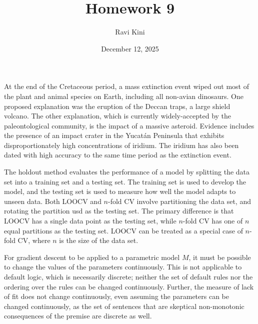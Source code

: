 \documentclass{article}
\title{Homework 9}
\author{Ravi Kini}
\date{December 12, 2025}
\begin{document}
\maketitle

\problem{}
At the end of the Cretaceous period, a mass extinction event wiped out most of the plant and animal species on Earth, including all non-avian dinosaurs. One proposed explanation was the eruption of the Deccan traps, a large shield volcano. The other explanation, which is currently widely-accepted by the paleontological community, is the impact of a massive asteroid. Evidence includes the presence of an impact crater in the Yucatán Peninsula that exhibits disproportionately high concentrations of iridium. The iridium has also been dated with high accuracy to the same time period as the extinction event.

\clearpage
\problem{}
The holdout method evaluates the performance of a model by splitting the data set into a training set and a testing set. The training set is used to develop the model, and the testing set is used to measure how well the model adapts to unseen data.
Both LOOCV and $n$-fold CV involve partitioning the data set, and rotating the partition usd as the testing set. The primary difference is that LOOCV has a single data point as the testing set, while $n$-fold CV has one of $n$ equal partitions as the testing set. LOOCV can be treated as a special case of $n$-fold CV, where $n$ is the size of the data set.

\clearpage
\problem{}
For gradient descent to be applied to a parametric model $M$, it must be possible to change the values of the parameters continuously. This is not applicable to default logic, which is necessarily discrete; neither the set of default rules nor the ordering over the rules can be changed continuously. Further, the measure of lack of fit does not change continuously, even assuming the parameters can be changed continuously, as the set of sentences that are skeptical non-monotonic consequences of the premise are discrete as well.
\end{document}

